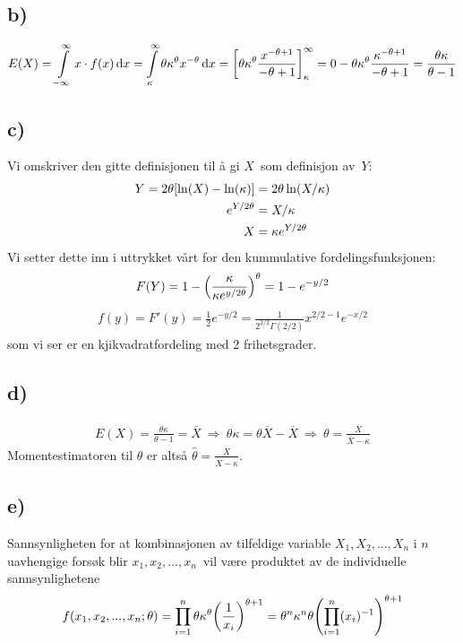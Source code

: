 \documentclass[12p,a4paper]{article}
\renewcommand{\exp}{e^}
\newcommand{\half}{\frac{1}{2}}
\renewcommand{\exp}{e^}
\renewcommand{\bar}{\overline}
\begin{document}
\subsection*{b)}
\begin{equation*}
    E(X) = \int\limits_{-\infty}^\infty x\cdot f(x) \dd{x}
         = \int\limits_{\kappa}^\infty \theta\kappa^\theta x^{-\theta} \dd{x}
         = \qty[ \theta\kappa^\theta \frac{x^{-\theta+1}}{-\theta+1} ]_{\kappa}^\infty 
         = 0 - \theta\kappa^\theta \frac{\kappa^{-\theta + 1}}{-\theta +1}
         = \frac{\theta\kappa}{\theta - 1}
\end{equation*}



\subsection*{c)}
Vi omskriver den gitte definisjonen til å gi $X$ som definisjon av $Y$:
\begin{align*}
    Y = 2\theta \qty[\ln(X) - \ln(\kappa)] &= 2\theta\ln(X/\kappa) \\
    \exp{Y/2\theta} &= X/\kappa \\
    X &= \kappa \exp{Y/2\theta}
\end{align*}
Vi setter dette inn i uttrykket vårt for den kummulative fordelingsfunksjonen:
\begin{align*}
    F(Y) = 1 - \qty(\frac{\kappa}{\kappa \exp{y/2\theta}})^\theta = 1 - \exp{-y/2}
\end{align*}
\begin{align*}
    f(y) = F'(y) = \half\exp{-y/2} = \frac{1}{2^{2/2}\Gamma(2/2)}x^{2/2-1}\exp{-x/2}
\end{align*}
som vi ser er en kjikvadratfordeling med 2 frihetsgrader.



\subsection*{d)}
\begin{align*}
    E(X) = \frac{\theta\kappa}{\theta - 1} = \bar{X} \ \Rightarrow \ 
    \theta\kappa = \theta\bar{X} - \bar{X} \ \Rightarrow \ 
    \theta = \frac{\bar{X}}{\bar{X} - \kappa}
\end{align*}
Momentestimatoren til $\theta$ er altså $\hat{\theta} = \frac{\bar{X}}{\bar{X} - \kappa}$.



\subsection*{e)}
Sannsynligheten for at kombinasjonen av tilfeldige variable $X_1, X_2,...,X_n$ i $n$ uavhengige forsøk blir $x_1, x_2,...,x_n$ vil være produktet av de individuelle sannsynlighetene
\begin{align*}
    f(x_1, x_2, ..., x_n; \theta) = \prod_{i=1}^n \theta\kappa^\theta\qty(\frac{1}{x_i})^{\theta+1} = \theta^n\kappa^n\theta \qty(\prod_{i=1}^n (x_i)^{-1})^{\theta+1}
\end{align*}
\end{document}
